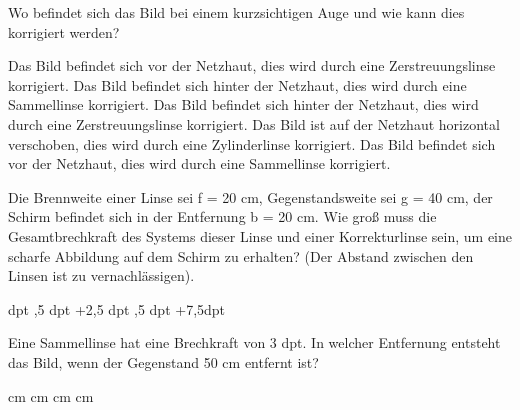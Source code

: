\documentclass[11pt]{exam}
\begin{document}
\setlength{\voffset}{-0.5in}
\setlength{\headsep}{5pt}

\hspace{2mm}
 \hspace{5mm}
\vspace{4mm}

\begin{questions}

\question Wo befindet sich das Bild bei einem kurzsichtigen Auge und wie kann dies korrigiert werden?

\begin{choices}
	\choice Das Bild befindet sich vor der Netzhaut, dies wird durch eine Zerstreuungslinse korrigiert.
	\choice Das Bild befindet sich hinter der Netzhaut, dies wird durch eine Sammellinse korrigiert.
	\choice Das Bild befindet sich hinter der Netzhaut, dies wird durch eine Zerstreuungslinse korrigiert.
	\choice Das Bild ist auf der Netzhaut horizontal verschoben, dies wird durch eine Zylinderlinse korrigiert.
	\choice Das Bild befindet sich vor der Netzhaut, dies wird durch eine Sammellinse korrigiert.
\end{choices}

\vspace{3mm}\question Die Brennweite einer Linse sei f = 20 cm, Gegenstandsweite sei g = 40 cm, der Schirm befindet sich in der Entfernung b = 20 cm. Wie groß muss die Gesamtbrechkraft des Systems dieser Linse und einer Korrekturlinse sein, um eine scharfe Abbildung auf dem Schirm zu erhalten? (Der Abstand zwischen den Linsen ist zu vernachlässigen).

\begin{choices}
	 dpt
	,5 dpt
	\choice +2,5 dpt
	,5 dpt
	\choice +7,5dpt
\end{choices}

\vspace{3mm}\question Eine Sammellinse hat eine Brechkraft von 3 dpt. In welcher Entfernung entsteht das Bild, wenn der Gegenstand 50 cm entfernt ist?

\begin{choices}
	 cm
	 cm
	 cm
	 cm
	\choice 100cm
\end{choices}


\end{questions}
\end{document}
